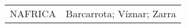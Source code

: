 \begin{table}
\begin{tabularx}{\textwidth}{lX}
  NAFRICA  & Barcarrota; Víznar; Zarra                                                                                                                                                                                                                                                                                                                                                                                                                                                                                                                                                                                                                                                                                                                                                                                                                                                                                                                                                                                                                                                                                                                                                                                                                                                                                                                                                                                                                                                                                                                                                                                                                                                                                                                                                                                                                                                                                                                                                                                                                                                                                                                                                                                                                                                                                                                                                                                                                                                                                                                                                                                                                                                                                                                                                                                                                                                                                                                                                                                                                                                                                                                                                                                                                                                                                                                                                                                   
\end{tabularx}
\end{table}
